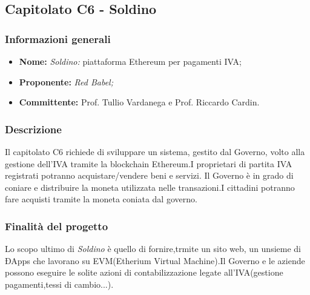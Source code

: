 \documentclass{article}
\begin{document}
	
	
	
	\subsection{Capitolato C6 - Soldino}
	
	\subsubsection{Informazioni generali}
	\begin{itemize}
		\item \textbf {Nome:} \textit{Soldino:} piattaforma Ethereum per pagamenti IVA;
		\item \textbf {Proponente:} \textit{Red Babel;}
		\item \textbf {Committente:} Prof. Tullio Vardanega e Prof. Riccardo Cardin.
	\end{itemize}
	
	\subsubsection{Descrizione}
	Il capitolato C6 richiede di sviluppare un sistema, gestito dal Governo, volto alla gestione dell'IVA tramite la blockchain Ethereum.I proprietari di partita IVA registrati potranno acquistare/vendere beni e servizi.
	Il Governo è in grado di coniare e distribuire la moneta utilizzata nelle transazioni.I cittadini potranno fare acquisti tramite la moneta coniata dal governo.   
	
	\subsubsection{Finalità del progetto}
	Lo scopo ultimo di \textit{Soldino} è quello di fornire,trmite un sito web, un unsieme di ÐApps che lavorano su EVM(Etherium Virtual Machine).Il Governo e le aziende possono eseguire le solite azioni di contabilizzazione legate all'IVA(gestione pagamenti,tessi di cambio...).  
\end{document}
